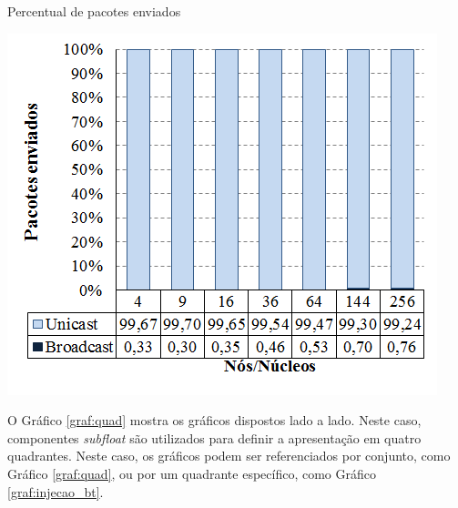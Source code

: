 \begin{grafico}[H]
  \setlength{\abovecaptionskip}{5pt}
  \setlength{\belowcaptionskip}{0pt}
  \caption[Percentual de pacotes enviados]
	  {Percentual de pacotes enviados}
  \centering
  \includegraphics[width=.48\textwidth]{imagem/graficos/grafico_pacotes_enviados_bt.png}
  \captionsetup[grafico]{justification=centering}
  \end{grafico}

  O Gráfico \ref{graf:quad} mostra os gráficos dispostos lado a lado. Neste caso, componentes \textit{subfloat}
  são utilizados para definir a apresentação em quatro quadrantes. Neste caso, os gráficos podem ser referenciados por conjunto,
  como Gráfico \ref{graf:quad}, ou por um quadrante específico, como Gráfico \ref{graf:injecao_bt}. 

